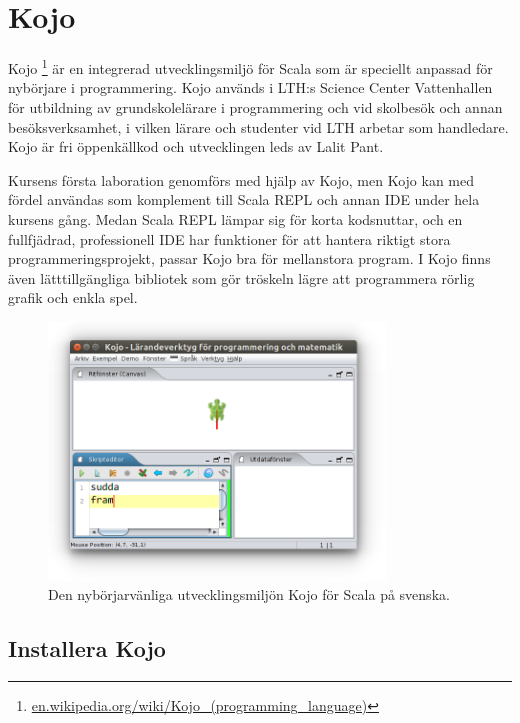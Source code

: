 \newpage

\section{Kojo}\label{appendix:ide:kojo}

Kojo%
\footnote{\href{https://en.wikipedia.org/wiki/Kojo_(programming_language)}{en.wikipedia.org/wiki/Kojo\_(programming\_language)}}
 är en integrerad utvecklingsmiljö för Scala som är speciellt anpassad för nybörjare i programmering. Kojo används i LTH:s Science Center Vattenhallen för utbildning av grundskolelärare i programmering och vid skolbesök och annan besöksverksamhet, i vilken lärare och studenter vid LTH arbetar som handledare. Kojo är fri öppenkällkod och utvecklingen leds av Lalit Pant.

Kursens första laboration genomförs med hjälp av Kojo, men Kojo kan med fördel användas som komplement till Scala REPL och annan IDE under hela kursens gång. Medan Scala REPL lämpar sig för korta kodsnuttar, och en fullfjädrad, professionell IDE har funktioner för att hantera riktigt stora programmeringsprojekt, passar Kojo bra för mellanstora program. I Kojo finns även lätttillgängliga bibliotek som gör tröskeln lägre att programmera rörlig grafik och enkla spel.   


\begin{figure}[H]
\centering
\includegraphics[width=0.8\textwidth]{../img/kojo/kojo.png}
\caption{Den nybörjarvänliga utvecklingsmiljön Kojo för Scala på svenska.}
\label{fig:appendix:ide:kojo}
\end{figure} 

\subsection{Installera Kojo}

